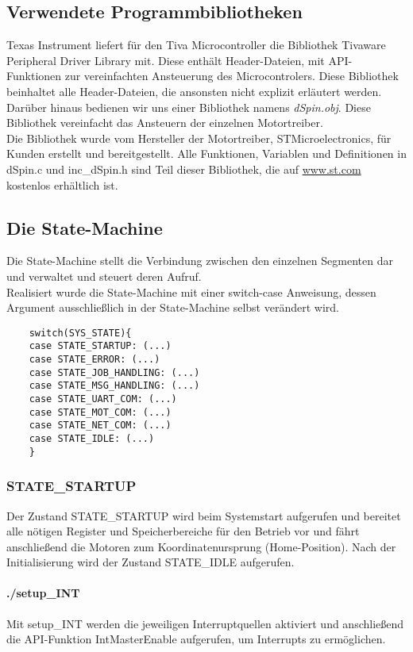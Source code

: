 \documentclass{scrartcl}
\begin{document}
\subsection{Verwendete Programmbibliotheken}
Texas Instrument liefert für den Tiva Microcontroller die Bibliothek Tivaware Peripheral Driver Library mit. Diese enthält Header-Dateien, mit API-Funktionen zur vereinfachten Ansteuerung des Microcontrolers. Diese Bibliothek beinhaltet alle Header-Dateien, die ansonsten nicht explizit erläutert werden.\\
Darüber hinaus bedienen wir uns einer Bibliothek namens \textit{dSpin.obj}. Diese Bibliothek vereinfacht das Ansteuern der einzelnen Motortreiber.\\
Die Bibliothek wurde vom Hersteller der Motortreiber, STMicroelectronics, für Kunden erstellt und bereitgestellt. Alle Funktionen, Variablen und Definitionen in dSpin.c und inc\_dSpin.h sind Teil dieser Bibliothek, die auf \url{www.st.com} kostenlos erhältlich ist. 

\subsection{Die State-Machine}
Die State-Machine stellt die Verbindung zwischen den einzelnen Segmenten dar und verwaltet und steuert deren Aufruf.\\
Realisiert wurde die State-Machine mit einer switch-case Anweisung, dessen Argument ausschließlich in der State-Machine selbst verändert wird. 
\begin{verbatim}
	switch(SYS_STATE){
	case STATE_STARTUP: (...)
	case STATE_ERROR: (...)
	case STATE_JOB_HANDLING: (...)
	case STATE_MSG_HANDLING: (...)
	case STATE_UART_COM: (...)
	case STATE_MOT_COM: (...)
	case STATE_NET_COM: (...)
	case STATE_IDLE: (...)
	}
\end{verbatim}

\subsubsection{STATE\_STARTUP}
Der Zustand STATE\_STARTUP wird beim Systemstart aufgerufen und bereitet alle nötigen Register und Speicherbereiche für den Betrieb vor und fährt anschließend die Motoren zum Koordinatenursprung (Home-Position). Nach der Initialisierung wird der Zustand STATE\_IDLE aufgerufen.

\paragraph{./setup\_INT}
Mit setup\_INT werden die jeweiligen Interruptquellen aktiviert und anschließend die API-Funktion IntMasterEnable aufgerufen, um Interrupts zu ermöglichen.
\end{document}
